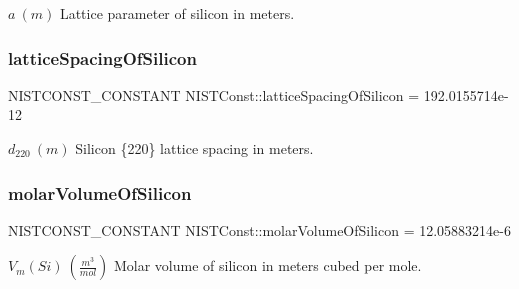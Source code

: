 $a \ (m)$ Lattice parameter of silicon in meters. \mbox{\label{group___n_i_s_t_const-_silicon_gadcadfe51b35f339a221e8ba56830b565}} 
\subsubsection{\texorpdfstring{lattice\+Spacing\+Of\+Silicon}{latticeSpacingOfSilicon}}
{\footnotesize\ttfamily N\+I\+S\+T\+C\+O\+N\+S\+T\+\_\+\+C\+O\+N\+S\+T\+A\+NT N\+I\+S\+T\+Const\+::lattice\+Spacing\+Of\+Silicon = 192.\+0155714e-\/12}

$d_{220} \ (m)$ Silicon \{220\} lattice spacing in meters. \mbox{\label{group___n_i_s_t_const-_silicon_ga5bd73eb57f2a0142f761e2aee3afdcfb}} 
\subsubsection{\texorpdfstring{molar\+Volume\+Of\+Silicon}{molarVolumeOfSilicon}}
{\footnotesize\ttfamily N\+I\+S\+T\+C\+O\+N\+S\+T\+\_\+\+C\+O\+N\+S\+T\+A\+NT N\+I\+S\+T\+Const\+::molar\+Volume\+Of\+Silicon = 12.\+05883214e-\/6}

$V_m(Si) \ (\frac{m^3}{mol})$ Molar volume of silicon in meters cubed per mole. 